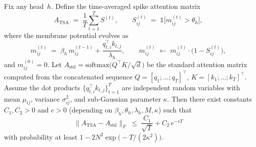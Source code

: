 \documentclass{article}
\begin{document}
\begin{theorem}
\label{thm:softmax_approx}
Fix any head~$h$.
Define the time-averaged spike attention matrix
\[
  A_{\mathrm{TSA}} \;=\; \frac{1}{T}\sum_{t=1}^{T} S^{(t)},
  \qquad
  S_{ij}^{(t)} \;=\; \mathbb{1}\!\bigl[m_{ij}^{(t)} > \theta_h\bigr],
\]
where the membrane potential evolves as
\begin{equation}\label{eq:membrane_dynamics}
  m_{ij}^{(t)} \;=\; \beta_h \, m_{ij}^{(t-1)}
    + \frac{q_{t,i}^\top k_{t,j}}{\lambda_h},
  \qquad
  m_{ij}^{(t)} \;\leftarrow\; m_{ij}^{(t)} \cdot \bigl(1 - S_{ij}^{(t)}\bigr),
\end{equation}
and $m_{ij}^{(0)} = 0$.
Let
$A_{\mathrm{std}} = \mathrm{softmax}\!\bigl(Q^\top K / \sqrt{d}\bigr)$
be the standard attention matrix computed from the concatenated sequence
$Q = [q_1;\ldots;q_T]^\top$, $K = [k_1;\ldots;k_T]^\top$.
Assume the dot products $\{q_{t,i}^\top k_{t,j}\}_{t=1}^T$ are
independent random variables with mean $\mu_{ij}$, variance $\sigma_{ij}^2$,
and sub-Gaussian parameter $\kappa$.
Then there exist constants $C_1, C_2 > 0$ and $c > 0$ (depending on
$\beta_h, \theta_h, \lambda_h, M, \kappa$) such that
\[
  \bigl\| A_{\mathrm{TSA}} - A_{\mathrm{std}} \bigr\|_F
  \;\le\; \frac{C_1}{\sqrt{T}} + C_2\,e^{-cT}
\]
with probability at least $1 - 2N^2 \exp\!\bigl(-T / (2\kappa^2)\bigr)$.
\end{theorem}
\end{document}
